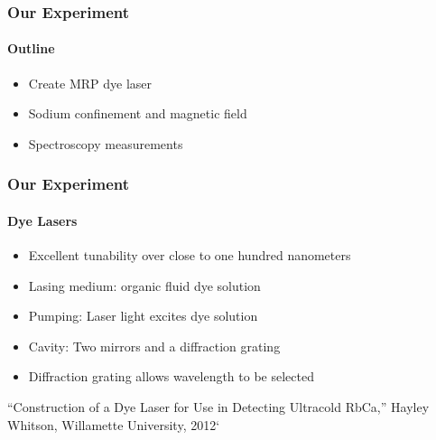 \documentclass{beamer}
\begin{document}
\begin{frame}
  \frametitle{Our Experiment}
  \framesubtitle{Outline}
  \begin{itemize}
	\item Create MRP dye laser
	\item Sodium confinement and magnetic field
	\item Spectroscopy measurements
  \end{itemize}
\end{frame}

\begin{frame}
  \frametitle{Our Experiment}
  \framesubtitle{Dye Lasers}
  \begin{itemize}
	\item Excellent tunability over close to one hundred nanometers
	\item Lasing medium: organic fluid dye solution\\ 
	\item Pumping: Laser light excites dye solution\\
	\item Cavity: Two mirrors and a diffraction grating\\
	\item Diffraction grating allows wavelength to be selected\\
  \end{itemize}
  \bigskip
  { \tiny``Construction of a Dye Laser for Use in Detecting Ultracold RbCa,'' Hayley Whitson, Willamette University, 2012`}

\end{frame}
\end{document}
